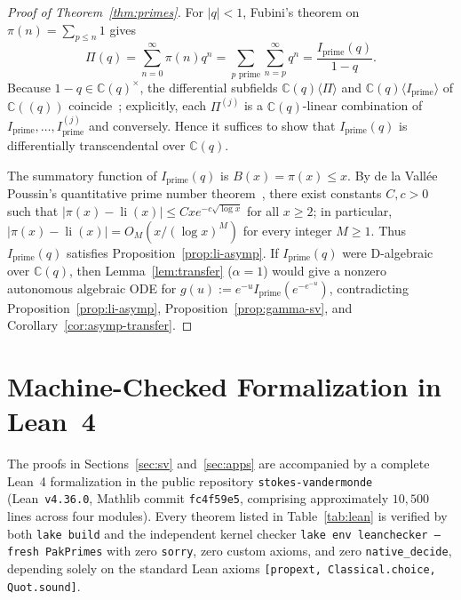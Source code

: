 \documentclass[10pt,reqno]{amsart}
\numberwithin{equation}{section}
\theoremstyle{definition}
\newcommand{\C}{\mathbb{C}}
\DeclareMathOperator{\li}{li}
\begin{document}
\begin{proof}[Proof of Theorem~\ref{thm:primes}]
For $|q| < 1$, Fubini's theorem on $\pi(n) = \sum_{p \le n} 1$ gives
\[
  \Pi(q) = \sum_{n=0}^\infty \pi(n) q^n = \sum_{p\text{ prime}} \sum_{n=p}^\infty q^n = \frac{I_{\mathrm{prime}}(q)}{1 - q}.
\]
Because $1 - q \in \C(q)^\times$, the differential subfields $\C(q)\langle \Pi \rangle$ and $\C(q)\langle I_{\mathrm{prime}} \rangle$ of $\C((q))$ coincide~\cite{Kolchin1973}; explicitly, each $\Pi^{(j)}$ is a $\C(q)$-linear combination of $I_{\mathrm{prime}}, \dots, I_{\mathrm{prime}}^{(j)}$ and conversely. Hence it suffices to show that $I_{\mathrm{prime}}(q)$ is differentially transcendental over $\C(q)$.

The summatory function of $I_{\mathrm{prime}}(q)$ is $B(x) = \pi(x) \le x$. By de la Vall\'ee Poussin's quantitative prime number theorem~\cite{delaValleePoussin1899}, there exist constants $C, c > 0$ such that $|\pi(x) - \li(x)| \le C x e^{-c\sqrt{\log x}}$ for all $x \ge 2$; in particular, $|\pi(x) - \li(x)| = O_M(x/(\log x)^M)$ for every integer $M \ge 1$. Thus $I_{\mathrm{prime}}(q)$ satisfies Proposition~\ref{prop:li-asymp}. If $I_{\mathrm{prime}}(q)$ were D-algebraic over $\C(q)$, then Lemma~\ref{lem:transfer} ($\alpha = 1$) would give a nonzero autonomous algebraic ODE for $g(u) := e^{-u} I_{\mathrm{prime}}(e^{-e^{-u}})$, contradicting Proposition~\ref{prop:li-asymp}, Proposition~\ref{prop:gamma-sv}, and Corollary~\ref{cor:asymp-transfer}.
\end{proof}

\section{Machine-Checked Formalization in Lean~4}\label{sec:lean}

The proofs in Sections~\ref{sec:sv} and~\ref{sec:apps} are accompanied by a complete Lean~4 formalization in the public repository \texttt{stokes-vandermonde}~\cite{Helminen2026StokesVandermonde} (Lean~\texttt{v4.36.0}, Mathlib commit \texttt{fc4f59e5}, comprising approximately $10{,}500$ lines across four modules). Every theorem listed in Table~\ref{tab:lean} is verified by both \texttt{lake build} and the independent kernel checker \texttt{lake env leanchecker --fresh PakPrimes} with zero \texttt{sorry}, zero custom axioms, and zero \texttt{native\_decide}, depending solely on the standard Lean axioms \texttt{[propext, Classical.choice, Quot.sound]}.
\end{document}
